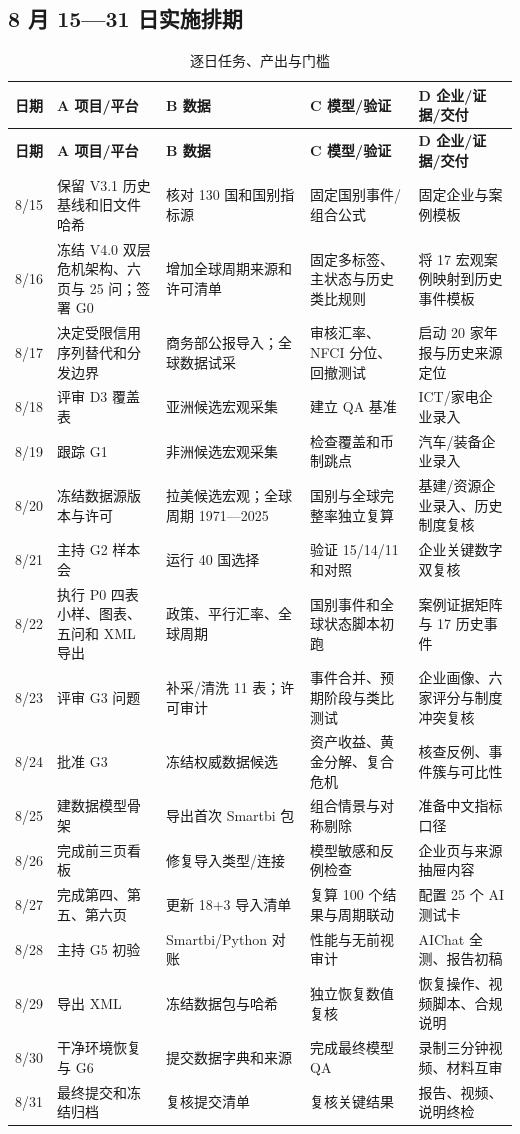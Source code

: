 \documentclass[UTF8,fontset=windows,12pt,openany]{ctexbook}
\begin{document}
\clearpage
\begin{landscape}
\chapter{8 月 15—31 日实施排期}
\begin{longtable}{p{2.2cm}p{4.1cm}p{3.7cm}p{3.7cm}p{3.7cm}}
\caption{逐日任务、产出与门槛}\label{tab:schedule}\\
\toprule
\textbf{日期} & \textbf{A 项目/平台} & \textbf{B 数据} & \textbf{C 模型/验证} & \textbf{D 企业/证据/交付}\\
\midrule
\endfirsthead
\toprule \textbf{日期} & \textbf{A 项目/平台} & \textbf{B 数据} & \textbf{C 模型/验证} & \textbf{D 企业/证据/交付}\\ \midrule
\endhead
8/15 & 保留 V3.1 历史基线和旧文件哈希 & 核对 130 国和国别指标源 & 固定国别事件/组合公式 & 固定企业与案例模板\\
8/16 & 冻结 V4.0 双层危机架构、六页与 25 问；签署 G0 & 增加全球周期来源和许可清单 & 固定多标签、主状态与历史类比规则 & 将 17 宏观案例映射到历史事件模板\\
8/17 & 决定受限信用序列替代和分发边界 & 商务部公报导入；全球数据试采 & 审核汇率、NFCI 分位、回撤测试 & 启动 20 家年报与历史来源定位\\
8/18 & 评审 D3 覆盖表 & 亚洲候选宏观采集 & 建立 QA 基准 & ICT/家电企业录入\\
8/19 & 跟踪 G1 & 非洲候选宏观采集 & 检查覆盖和币制跳点 & 汽车/装备企业录入\\
8/20 & 冻结数据源版本与许可 & 拉美候选宏观；全球周期 1971—2025 & 国别与全球完整率独立复算 & 基建/资源企业录入、历史制度复核\\
8/21 & 主持 G2 样本会 & 运行 40 国选择 & 验证 15/14/11 和对照 & 企业关键数字双复核\\
8/22 & 执行 P0 四表小样、图表、五问和 XML 导出 & 政策、平行汇率、全球周期 & 国别事件和全球状态脚本初跑 & 案例证据矩阵与 17 历史事件\\
8/23 & 评审 G3 问题 & 补采/清洗 11 表；许可审计 & 事件合并、预期阶段与类比测试 & 企业画像、六家评分与制度冲突复核\\
8/24 & 批准 G3 & 冻结权威数据候选 & 资产收益、黄金分解、复合危机 & 核查反例、事件簇与可比性\\
8/25 & 建数据模型骨架 & 导出首次 Smartbi 包 & 组合情景与对称剔除 & 准备中文指标口径\\
8/26 & 完成前三页看板 & 修复导入类型/连接 & 模型敏感和反例检查 & 企业页与来源抽屉内容\\
8/27 & 完成第四、第五、第六页 & 更新 18+3 导入清单 & 复算 100 个结果与周期联动 & 配置 25 个 AI 测试卡\\
8/28 & 主持 G5 初验 & Smartbi/Python 对账 & 性能与无前视审计 & AIChat 全测、报告初稿\\
8/29 & 导出 XML & 冻结数据包与哈希 & 独立恢复数值复核 & 恢复操作、视频脚本、合规说明\\
8/30 & 干净环境恢复与 G6 & 提交数据字典和来源 & 完成最终模型 QA & 录制三分钟视频、材料互审\\
8/31 & 最终提交和冻结归档 & 复核提交清单 & 复核关键结果 & 报告、视频、说明终检\\
\bottomrule
\end{longtable}
\end{landscape}
\end{document}
